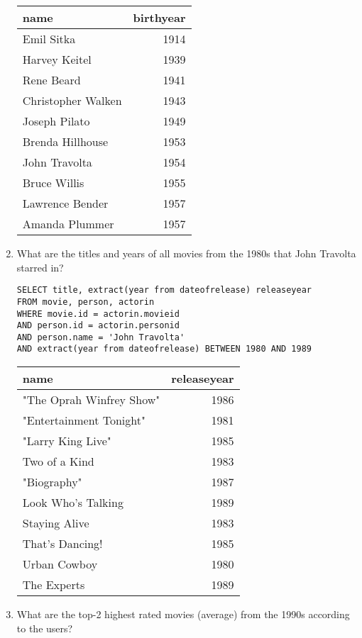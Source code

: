 \begin{enumerate}
\begin{tabular}{|l|r|}
\hline
name & birthyear \\ \hline
Emil Sitka & 1914 \\ \hline
Harvey Keitel & 1939 \\ \hline
Rene Beard & 1941 \\ \hline
Christopher Walken & 1943 \\ \hline
Joseph Pilato & 1949 \\ \hline
Brenda Hillhouse & 1953 \\ \hline
John Travolta & 1954 \\ \hline
Bruce Willis & 1955 \\ \hline
Lawrence Bender & 1957 \\ \hline
Amanda Plummer & 1957 \\ \hline
\end{tabular}


\item What are the titles and years of all movies from the 1980s that John Travolta starred in?

\begin{lstlisting}
SELECT title, extract(year from dateofrelease) releaseyear
FROM movie, person, actorin
WHERE movie.id = actorin.movieid
AND person.id = actorin.personid
AND person.name = 'John Travolta'
AND extract(year from dateofrelease) BETWEEN 1980 AND 1989
\end{lstlisting}

\begin{tabular}{|l|r|}
\hline
name & releaseyear \\ \hline
"The Oprah Winfrey Show" & 1986 \\ \hline
"Entertainment Tonight" & 1981 \\ \hline
"Larry King Live" & 1985 \\ \hline
Two of a Kind & 1983 \\ \hline
"Biography" & 1987 \\ \hline
Look Who's Talking & 1989 \\ \hline
Staying Alive & 1983 \\ \hline
That's Dancing! & 1985 \\ \hline
Urban Cowboy & 1980 \\ \hline
The Experts & 1989 \\ \hline
\end{tabular}

\item What are the top-2 highest rated movies (average) from the 1990s according to the users?


\end{enumerate}
